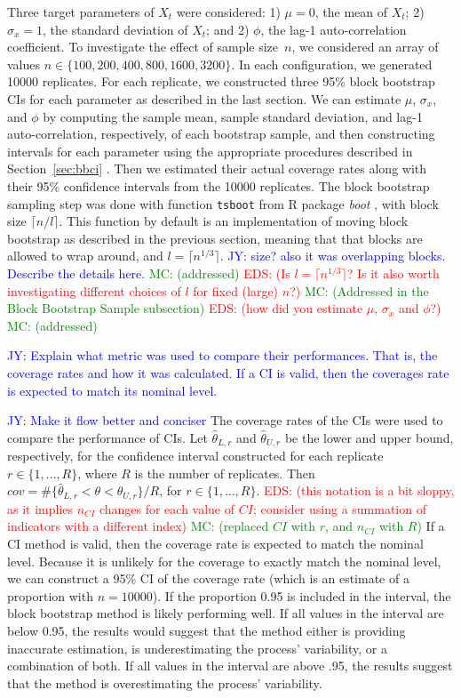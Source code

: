 \documentclass[12pt, letterpaper, titlepage]{article}
\newcommand{\jy}[1]{\textcolor{blue}{JY: #1}}
\newcommand{\eds}[1]{\textcolor{red}{EDS: (#1)}}
\newcommand{\mc}[1]{\textcolor{green}{MC: (#1)}}
\begin{document}
Three target parameters of $X_t$ were considered:
1) $\mu = 0$, the mean of $X_t$;
2) $\sigma_x = 1$, the standard deviation of $X_t$; and
2) $\phi$, the lag-1 auto-correlation coefficient.
To investigate the effect of sample size~$n$, we considered an array of values
$n \in \{100, 200, 400, 800, 1600, 3200\}$. In each configuration, we generated 10000
replicates. For each replicate, we constructed three 95\% block bootstrap
CIs for each parameter as described in the last section. We can estimate 
$\mu$, $\sigma_x$, and $\phi$ by computing the sample mean, sample 
standard deviation,
and lag-1 auto-correlation, respectively, of each bootstrap sample, and then 
constructing intervals for each parameter using the appropriate procedures
described in Section~\ref{sec:bbci} .
Then we estimated their actual coverage rates along with their 95\% confidence
intervals from the 10000 replicates. The block bootstrap sampling step was done
with function \texttt{tsboot} from R package \textsl{boot} \citep{boot}, with
block size $\lceil n / l \rceil$. This function by default is an implementation
of moving block bootstrap as described in the previous section, meaning that
that blocks are allowed to wrap around, and $l = \lceil n^{1/3} \rceil$.
\jy{size? also it was overlapping blocks. Describe the details here.}
\mc{addressed}
\eds{Is $l = \lceil n^{1/3} \rceil$? Is it also worth investigating different 
choices of $l$ for fixed (large) $n$?}
\mc{Addressed in the Block Bootstrap Sample subsection}
\eds{how did you estimate $\mu$, $\sigma_x$ and $\phi$?}
\mc{addressed}

\jy{Explain what metric was used to compare their performances. That is, the
  coverage rates and how it was calculated. If a CI is valid, then the coverages
  rate is expected to match its nominal level.}

\jy{Make it flow better and conciser}
The coverage rates of the CIs were used to compare the performance of CIs. Let
$\hat\theta_{L, r}$ and $\hat\theta_{U, r}$ be the lower and upper bound,
respectively, for the confidence interval constructed for each replicate
$r \in \{1, \ldots, R\}$, where $R$ is the
number of replicates.
Then $cov = \#\{\hat\theta_{L, r} < \theta < \hat\theta_{U, r} \}/R$,  
for $r \in \{1, \ldots, R\}$.
\eds{this notation is a bit sloppy, as it implies $n_{CI}$ changes for each 
value of $CI$; consider using a summation of indicators with a different index}
\mc{replaced $CI$ with $r$, and $n_{CI}$ with $R$}
If a CI method is valid, then the coverage rate is expected to match the
nominal 
level. Because it is unlikely for the coverage to exactly match the nominal
level,
we can construct a 95\% CI of the coverage
rate (which is an estimate of a proportion with $n = 10000$). If the proportion
0.95 is included in the interval, the block bootstrap method is likely
performing
well. If all values in the interval are below 0.95, the results would suggest 
that the
method either is providing inaccurate estimation, is underestimating the
process' variability, or a combination of both. If all values in the interval
are above .95, the results suggest that the method is overestimating the
process' variability.
\end{document}
